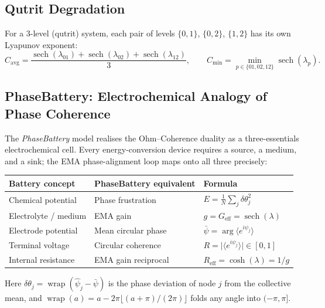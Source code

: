 \documentclass[12pt,a4paper]{article}
\theoremstyle{plain}
\theoremstyle{definition}
\theoremstyle{remark}
\newcommand{\abs}[1]{\lvert #1 \rvert}
\newcommand{\Reff}{R_{\mathrm{eff}}}
\begin{document}
\subsection{Qutrit Degradation}

For a 3-level (qutrit) system, each pair of levels $\{0,1\}$, $\{0,2\}$,
$\{1,2\}$ has its own Lyapunov exponent:
\begin{equation}
  C_{\mathrm{avg}}
  = \frac{\operatorname{sech}(\lambda_{01})
         +\operatorname{sech}(\lambda_{02})
         +\operatorname{sech}(\lambda_{12})}{3},\qquad
  C_{\min} = \min_{p\in\{01,02,12\}}\operatorname{sech}(\lambda_p).
  \label{eq:qutrit}
\end{equation}

\subsection{PhaseBattery: Electrochemical Analogy of Phase Coherence}
\label{sec:phase-battery}

The \emph{PhaseBattery} model realises the Ohm--Coherence duality as a
three-essentials electrochemical cell.  Every energy-conversion device
requires a source, a medium, and a sink; the EMA phase-alignment loop
maps onto all three precisely:

\begin{center}
\renewcommand{\arraystretch}{1.2}
\begin{tabular}{@{}lll@{}}
\toprule
Battery concept & PhaseBattery equivalent & Formula\\
\midrule
Chemical potential  & Phase frustration
  & $E = \frac{1}{N}\sum_j \delta\theta_j^2$\\
Electrolyte / medium & EMA gain
  & $g = G_{\mathrm{eff}} = \operatorname{sech}(\lambda)$\\
Electrode potential & Mean circular phase
  & $\bar\psi = \arg\langle e^{i\psi_j}\rangle$\\
Terminal voltage & Circular coherence
  & $R = \abs{\langle e^{i\psi_j}\rangle} \in [0,1]$\\
Internal resistance & EMA gain reciprocal
  & $\Reff = \cosh(\lambda) = 1/g$\\
\bottomrule
\end{tabular}
\end{center}

\noindent
Here $\delta\theta_j = \operatorname{wrap}(\hat\psi_j - \bar\psi)$ is the
phase deviation of node $j$ from the collective mean, and
$\operatorname{wrap}(a) = a - 2\pi\lfloor(a+\pi)/(2\pi)\rfloor$ folds any
angle into $(-\pi,\pi]$.
\end{document}
